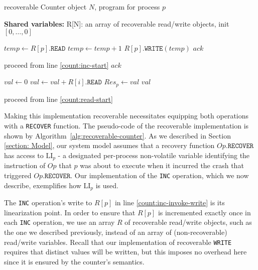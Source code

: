 \begin{algorithm}[b]%

	\caption{recoverable Counter object $N$, program for process $p$}
	\label{alg:recoverable-counter}
	
	\hspace*{\algorithmicindent} \textbf{Shared variables:}
	R[N]: an array of recoverable read/write objects, init $[0,\ldots,0]$

	\begin{multicols}{2}
	\begin{algorithmic}[1]	
		\State $temp \gets R[p].\texttt{READ}$ \label{count:inc-start}
		\State $temp \gets temp+1$
		\State $R[p].\texttt{WRITE}(temp)$ \label{count:inc-invoke-write}
		\State \Return $ack$ \label{count:inc-return}
		\EndProcedure
		
			\State proceed from line \ref{count:inc-start}
		\Else{}
			\State \Return $ack$
		\EndIf
		\EndProcedure
		
		\columnbreak
		
		\State $val \gets 0$ \label{count:read-start}
			\State $val \gets val+R[i].\texttt{READ}$
		\EndFor
		\State $Res_p \gets val$
		\State \Return $val$
		\EndProcedure
		
		\State proceed from line \ref{count:read-start}
		\EndProcedure
	\end{algorithmic}
\end{multicols}
\end{algorithm}

Making this implementation recoverable necessitates equipping both operations with a \texttt{RECOVER} function. The pseudo-code of the recoverable implementation is shown by Algorithm~\ref{alg:recoverable-counter}.
As we described in Section \ref{section: Model}, our system model assumes that a recovery function $Op.\texttt{RECOVER}$ has access to $\text{LI}_p$ - a designated per-process non-volatile variable identifying the instruction of $Op$ that $p$ was about to execute when it incurred the crash that triggered $Op.\texttt{RECOVER}$. Our implementation of the \texttt{INC} operation, which we now describe, exemplifies how $\text{LI}_p$ is used.

The \texttt{INC} operation's write to $R[p]$ in line \ref{count:inc-invoke-write} is its linearization point. In order to ensure that $R[p]$ is incremented exactly once in each \texttt{INC} operation, we use an array $R$ of recoverable read/write objects, such as the one we described previously, instead of an array of (non-recoverable) read/write variables. Recall that our implementation of recoverable \texttt{WRITE} requires that distinct values will be written, but this imposes no overhead here since it is ensured by the counter's semantics.

